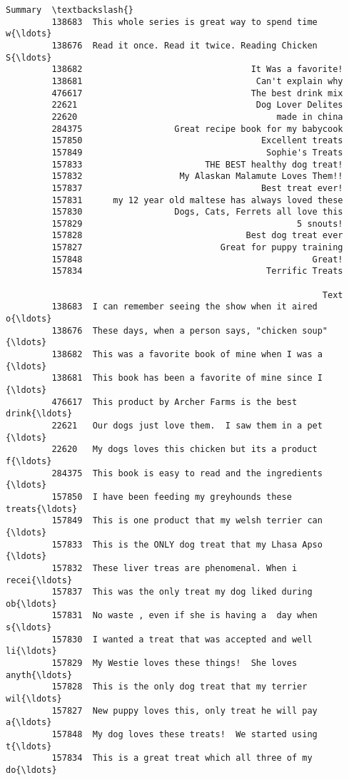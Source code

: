 \documentclass[11pt]{article}
\begin{document}
\begin{Verbatim}[commandchars=\\\{\}]
                                                           Summary  \textbackslash{}
         138683  This whole series is great way to spend time w{\ldots}   
         138676  Read it once. Read it twice. Reading Chicken S{\ldots}   
         138682                                 It Was a favorite!   
         138681                                  Can't explain why   
         476617                                 The best drink mix   
         22621                                   Dog Lover Delites   
         22620                                       made in china   
         284375                  Great recipe book for my babycook   
         157850                                   Excellent treats   
         157849                                    Sophie's Treats   
         157833                        THE BEST healthy dog treat!   
         157832                   My Alaskan Malamute Loves Them!!   
         157837                                   Best treat ever!   
         157831      my 12 year old maltese has always loved these   
         157830                  Dogs, Cats, Ferrets all love this   
         157829                                          5 snouts!   
         157828                                Best dog treat ever   
         157827                           Great for puppy training   
         157848                                             Great!   
         157834                                    Terrific Treats   
         
                                                              Text  
         138683  I can remember seeing the show when it aired o{\ldots}  
         138676  These days, when a person says, "chicken soup"{\ldots}  
         138682  This was a favorite book of mine when I was a {\ldots}  
         138681  This book has been a favorite of mine since I {\ldots}  
         476617  This product by Archer Farms is the best drink{\ldots}  
         22621   Our dogs just love them.  I saw them in a pet {\ldots}  
         22620   My dogs loves this chicken but its a product f{\ldots}  
         284375  This book is easy to read and the ingredients {\ldots}  
         157850  I have been feeding my greyhounds these treats{\ldots}  
         157849  This is one product that my welsh terrier can {\ldots}  
         157833  This is the ONLY dog treat that my Lhasa Apso {\ldots}  
         157832  These liver treas are phenomenal. When i recei{\ldots}  
         157837  This was the only treat my dog liked during ob{\ldots}  
         157831  No waste , even if she is having a  day when s{\ldots}  
         157830  I wanted a treat that was accepted and well li{\ldots}  
         157829  My Westie loves these things!  She loves anyth{\ldots}  
         157828  This is the only dog treat that my terrier wil{\ldots}  
         157827  New puppy loves this, only treat he will pay a{\ldots}  
         157848  My dog loves these treats!  We started using t{\ldots}  
         157834  This is a great treat which all three of my do{\ldots}  
\end{Verbatim}
            
\end{document}

